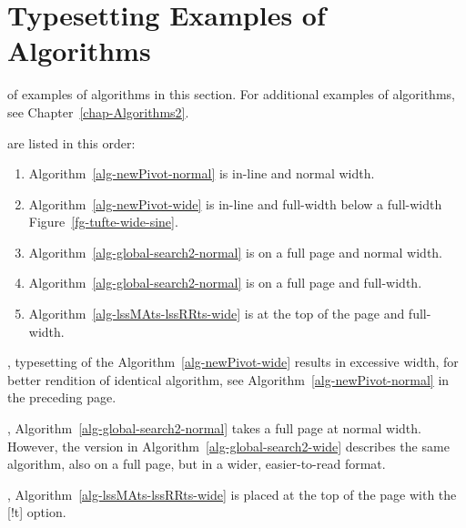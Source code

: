 
\section{Typesetting Examples of Algorithms}
\label{chap-About-Algorithms}

 of examples of algorithms in this section.
For additional examples of algorithms, see Chapter~\ref{chap-Algorithms2}.

\lipsum[4]



 are listed in this order:
\begin{enumerate} 
\item 
Algorithm~\ref{alg-newPivot-normal} is in-line and normal width.
\item
Algorithm~\ref{alg-newPivot-wide} is in-line and full-width
below a full-width Figure~\ref{fg-tufte-wide-sine}.
\item 
Algorithm~\ref{alg-global-search2-normal} is on a full page and normal width.
\item 
Algorithm~\ref{alg-global-search2-normal} is on a full page and full-width.
\item 
Algorithm~\ref{alg-lssMAts-lssRRts-wide} is at the top of the page and full-width.
\end{enumerate}

\clearpage



, typesetting of the Algorithm~\ref{alg-newPivot-wide} results in excessive width, for better rendition 
of identical algorithm, see
Algorithm~\ref{alg-newPivot-normal} in the preceding page.

\lipsum[4]

, Algorithm~\ref{alg-global-search2-normal}
takes a full page at normal width. However, the version
in  Algorithm~\ref{alg-global-search2-wide} describes the same
algorithm, also on a full page, but in a wider, easier-to-read 
format.






\clearpage


, Algorithm~\ref{alg-lssMAts-lssRRts-wide}
is placed at the top of the page with the [!t] option.
\lipsum[4]
\lipsum[1]

